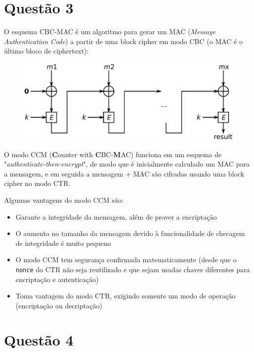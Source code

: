\documentclass{article}
\begin{document}
\newpage
\section*{Questão 3}

O esquema CBC-MAC é um algoritmo para gerar um MAC (\textit{Message Authentication Code}) a partir de uma block cipher em modo CBC (o MAC é o último bloco de ciphertext):

\FloatBarrier
\begin{figure}[!ht]
    \begin{center}
        \includegraphics[width=\textwidth]{images/cbc_mac.png}
    \end{center}
\end{figure} 

O modo CCM (\textbf{C}ounter with \textbf{C}BC-\textbf{M}AC) funciona em um esquema de "\textit{authenticate-then-encrypt}", de modo que é inicialmente calculado um MAC para a mensagem, e em seguida a mensagem + MAC são cifradas usando uma block cipher no modo CTR.

Algumas vantagens do modo CCM são:

\begin{itemize}
    \item Garante a integridade da mensagem, além de prover a encriptação
    \item O aumento no tamanho da mensagem devido à funcionalidade de checagem de integridade é muito pequeno
    \item O modo CCM tem segurança confirmada matematicamente (desde que o \texttt{nonce} do CTR não seja reutilizado e que sejam usadas chaves diferentes para encriptação e autenticação)
    \item Toma vantagem do modo CTR, exigindo somente um modo de operação (encriptação ou decriptação)
\end{itemize}

\section*{Questão 4}
\end{document}
